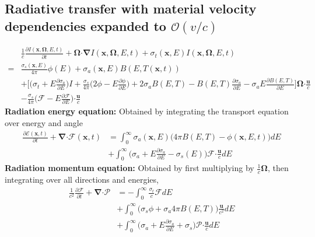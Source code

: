 \documentclass[10pt,letterpaper,notitlepage]{article}
\numberwithin{equation}{section}
\newcommand{\partialderiv}[2]{\frac{\partial #1}{\partial #2}}
\newcommand{\Omegabf}{\mathbf{\Omega}}
\newcommand{\bnabla}{\boldsymbol{\nabla}}
\newcommand{\position}{\mathbf{x}}
\newcommand{\dotp}{\boldsymbol{\cdot}}
\newcommand{\RadE}{\mathcal{E}}
\newcommand{\RadF}{\boldsymbol{\mathcal{F}}}
\newcommand{\RadP}{\boldsymbol{\mathcal{P}}}
\newcommand{\beqn}{\begin{equation}\begin{aligned}}
\newcommand{\eeqn}{\end{aligned}\end{equation}}
\begin{document}
\subsection{Radiative transfer with material velocity dependencies expanded to $\mathcal{O}(v/c)$}
\beqn 
&\frac{1}{c} \frac{\partial I(\position, \Omegabf, E, t)}{\partial t} 
+\Omegabf \dotp \bnabla I(\position, \Omegabf, E, t)
+\sigma_t(\position,E) I(\position, \Omegabf, E, t) \\
=& \frac{\sigma_s(\position,E)}{4\pi} \phi(E)
+ \sigma_a(\position,E) B(E,T(\position, t))\\
&+
\biggr[
\biggr( \sigma_t + E \frac{\partial \sigma_a}{\partial E} \biggr) I
+\frac{\sigma_s}{4\pi}
\biggr(
2\phi - E \frac{\partial \phi}{\partial E}
\biggr)
+2\sigma_a B(E,T)
- B(E,T) \frac{\partial \sigma_a}{\partial E}
-\sigma_a E \frac{\partial B(E,T)}{\partial E}
\biggr] \Omegabf \dotp \frac{\mathbf{u}}{c} \\
&-\frac{\sigma_s}{4\pi} \biggr( \RadF - E \frac{\partial \RadF}{\partial E} \biggr) \dotp \frac{\mathbf{u}}{c}
\eeqn 
\newline
\newline
\textbf{Radiation energy equation:}\newline 
Obtained by integrating the transport equation over energy and angle
\beqn 
 \frac{\partial \RadE(\position, t)}{\partial t} 
+\bnabla \dotp \RadF(\position, t) &= \int_0^\infty \sigma_a(\position, E) \bigr( 4\pi B(E,T) - \phi(\position, E, t) \bigr) dE \\
&+\int_0^\infty \biggr( \sigma_a + E \frac{\partial \sigma_a}{\partial E} - \sigma_s(E)\biggr)
\RadF \dotp  \frac{\mathbf{u}}{c}
dE
\eeqn 
\newline
\newline 
\textbf{Radiation momentum equation:}\newline
Obtained by first multiplying by $\frac{1}{c} \Omegabf$, then integrating over all directions and energies,
\beqn 
\frac{1}{c^2} \partialderiv{\RadF}{t} + \bnabla \dotp \RadP &= -\int_0^\infty \frac{\sigma_t}{c} \RadF dE \\
&+\int_0^\infty \bigr( \sigma_s \phi + \sigma_a 4\pi B(E,T) \bigr) \frac{\mathbf{u}}{c^2}dE \\
&+\int_0^\infty \biggr( \sigma_a + E \partialderiv{\sigma_a}{E} + \sigma_s\biggr) \RadP \dotp \frac{\mathbf{u}}{c} dE
\eeqn 
\end{document}
